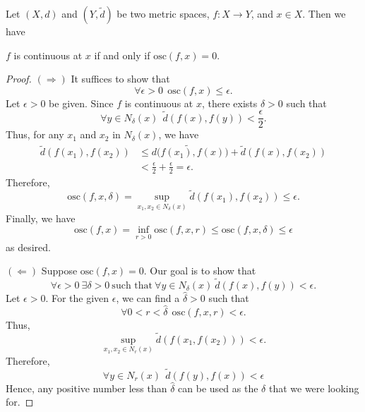 \begin{theorem}[ ]
    Let \( (X,d) \) and \( (Y, \tilde{d}) \) be two metric spaces, \( f: X \to Y  \), and \( x \in X  \). Then we have
    \begin{center}
        \( f  \) is continuous at \( x  \) if and only if \( \text{osc}(f,x) = 0 \).
    \end{center}
\end{theorem}
\begin{proof}
\( (\Longrightarrow) \) It suffices to show that 
\[  \forall \epsilon > 0 \ \ \text{osc}(f,x) \leq \epsilon. \]
Let \( \epsilon > 0  \) be given. Since \( f  \) is continuous at \( x  \), there exists \( \delta > 0  \) such that  
\[  \forall y \in {N}_{\delta}(x) \ \ \tilde{d}(f(x), f(y)) < \frac{ \epsilon }{ 2 }. \]
Thus, for any \( {x}_{1} \) and \( {x}_{2}  \) in \( {N}_{\delta}(x)  \), we have 
\begin{align*}
    \tilde{d}(f({x}_{1}), f({x}_{2})) &\leq \tilde{d(f({x}_{1}), f(x)} ) + \tilde{d}(f(x), f({x}_{2})) \\
                                      &< \frac{ \epsilon }{ 2 }  + \frac{ \epsilon }{ 2 }  = \epsilon.
\end{align*}
Therefore, 
\[  \text{osc}(f,x,\delta) = \sup_{{x}_{1}, {x}_{2} \in {N}_{\delta}(x)} \tilde{d}(f({x}_{1}), f({x}_{2})) \leq \epsilon. \]
Finally, we have 
\[  \text{osc}(f,x) = \inf_{r > 0} \text{osc}(f,x,r) \leq \text{osc}(f,x,\delta) \leq \epsilon \]
as desired.

\( (\Longleftarrow) \) Suppose \( \text{osc}(f,x) = 0  \). Our goal is to show that 
\[  \forall \epsilon > 0 \ \exists \delta > 0 \ \text{such that} \ \forall y \in {N}_{\delta}(x) \ \tilde{d}(f(x) , f(y)) < \epsilon. \tag{*} \]
Let \( \epsilon > 0  \). For the given \( \epsilon  \), we can find a \( \hat{\delta} > 0  \) such that  
\[  \forall 0 < r < \hat{\delta} \ \ \text{osc}(f,x,r) < \epsilon. \]
Thus, 
\[  \sup_{{x}_{1}, {x}_{2} \in {N}_{r}(x)} \tilde{d}(f({x}_{1}, f({x}_{2})))  < \epsilon. \]
Therefore,  
\[  \forall y \in {N}_{r}(x) \ \ \tilde{d} (f(y) , f(x)) < \epsilon \]
Hence, any positive number less than \( \hat{\delta}  \) can be used as the \( \delta  \) that we were looking for.
\end{proof}

